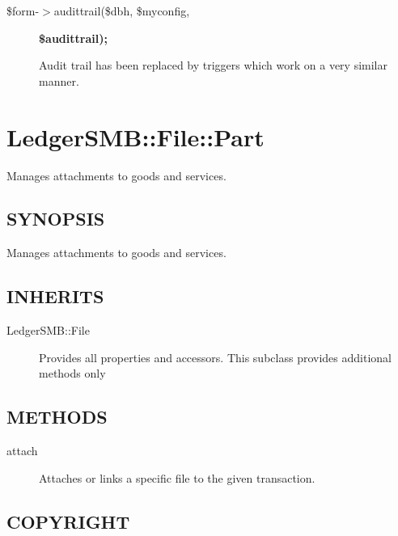 \begin{description}
\begin{description}
\begin{description}
\begin{description}
\begin{description}
\begin{description}
\item[{\$form-$>$audittrail(\$dbh, \$myconfig,}] \textbf{\$audittrail);}

Audit trail has been replaced by triggers which work on a very similar manner.

\end{description}
\section{LedgerSMB::File::Part\label{LedgerSMB::File::Part}}


Manages attachments to goods and services.

\subsection*{SYNOPSIS\label{LedgerSMB::File::Part_SYNOPSIS}}


Manages attachments to goods and services.

\subsection*{INHERITS\label{LedgerSMB::File::Part_INHERITS}}
\begin{description}

\item[{LedgerSMB::File}] \mbox{}

Provides all properties and accessors.  This subclass provides additional 
methods only

\end{description}
\subsection*{METHODS\label{LedgerSMB::File::Part_METHODS}}
\begin{description}

\item[{attach}] \mbox{}

Attaches or links a specific file to the given transaction.

\end{description}
\subsection*{COPYRIGHT\label{LedgerSMB::File::Part_COPYRIGHT}}



\end{description}
\end{description}
\end{description}
\end{description}
\end{description}
